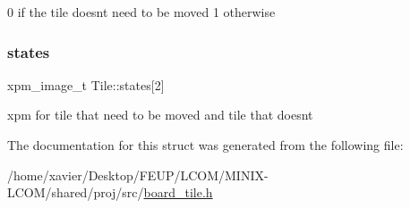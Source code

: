 0 if the tile doesn\textquotesingle{}t need to be moved 1 otherwise \mbox{\label{structTile_ac2305203d73f4be5ecfe5e4e393e58ab}} 
\subsubsection{\texorpdfstring{states}{states}}
{\footnotesize\ttfamily xpm\+\_\+image\+\_\+t Tile\+::states\mbox{[}2\mbox{]}}

xpm for tile that need to be moved and tile that doesn\textquotesingle{}t 

The documentation for this struct was generated from the following file\+:\begin{DoxyCompactItemize}
\item 
/home/xavier/\+Desktop/\+F\+E\+U\+P/\+L\+C\+O\+M/\+M\+I\+N\+I\+X-\/\+L\+C\+O\+M/shared/proj/src/\hyperlink{board__tile_8h}{board\+\_\+tile.\+h}\end{DoxyCompactItemize}
